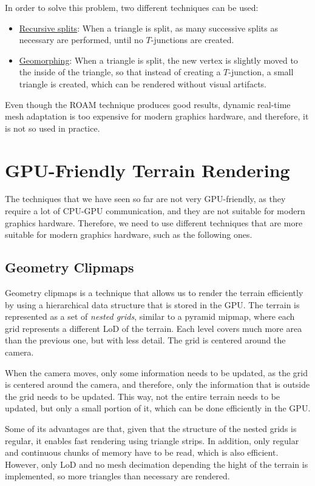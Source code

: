 In order to solve this problem, two different techniques can be used:
\begin{itemize}
    \item \ul{Recursive splits}: When a triangle is split, as many successive splits as necessary are performed, until no $T$-junctions are created.
    \item \ul{Geomorphing}: When a triangle is split, the new vertex is slightly moved to the inside of the triangle, so that instead of creating a $T$-junction, a small triangle is created, which can be rendered without visual artifacts.
\end{itemize}

Even though the ROAM technique produces good results, dynamic real-time mesh adaptation is too expensive for modern graphics hardware, and therefore, it is not so used in practice.

\section{GPU-Friendly Terrain Rendering}

The techniques that we have seen so far are not very GPU-friendly, as they require a lot of CPU-GPU communication, and they are not suitable for modern graphics hardware. Therefore, we need to use different techniques that are more suitable for modern graphics hardware, such as the following ones.

\subsection{Geometry Clipmaps}

Geometry clipmaps is a technique that allows us to render the terrain efficiently by using a hierarchical data structure that is stored in the GPU. The terrain is represented as a set of \emph{nested grids}, similar to a pyramid mipmap, where each grid represents a different LoD of the terrain. Each level covers much more area than the previous one, but with less detail. The grid is centered around the camera.

When the camera moves, only some information needs to be updated, as the grid is centered around the camera, and therefore, only the information that is outside the grid needs to be updated. This way, not the entire terrain needs to be updated, but only a small portion of it, which can be done efficiently in the GPU.

Some of its advantages are that, given that the structure of the nested grids is regular, it enables fast rendering using triangle strips. In addition, only regular and continuous chunks of memory have to be read, which is also efficient. However, only LoD and no mesh decimation depending the hight of the terrain is implemented, so more triangles than necessary are rendered.


